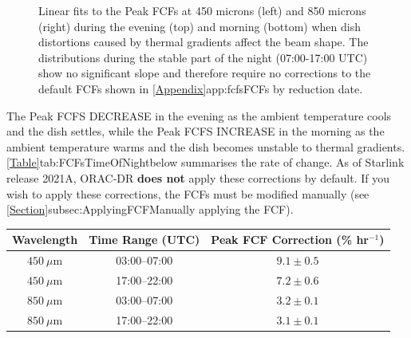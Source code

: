\begin{figure}
\begin{center}
\caption[FCFs Time of Night Fits]{Linear fits to the Peak FCFs at 450 microns (left) and 850 microns (right)
 during the evening (top) and morning (bottom) when dish distortions caused by thermal gradients affect the 
 beam shape. The distributions during the stable part of the night (07:00-17:00 UTC) show no significant 
 slope and therefore require no corrections to the default FCFs shown in
 \cref{Appendix}{app:fcfs}{FCFs by reduction date}. \label{fig:FCFsTimeOfNightFits}}
\end{center}
\end{figure}


The Peak FCFS DECREASE in the evening as the ambient temperature cools and the dish settles, while
the Peak FCFS INCREASE in the morning as the ambient temperature warms and the dish becomes
unstable to thermal gradients. \cref{Table}{tab:FCFsTimeOfNight}{below} summarises the rate of change.
As of Starlink release 2021A, ORAC-DR \textbf{does not} apply these corrections by default. If
you wish to apply these corrections, the FCFs must be modified manually (see
\cref{Section}{subsec:ApplyingFCF}{Manually applying the FCF}).


\begin{table}[h!]
\begin{center}
\begin{tabular}{|c|c|c|}
 \hline
 \multicolumn{1}{|c|}{Wavelength} &
 \multicolumn{1}{c|}{Time Range (UTC)} &
 \multicolumn{1}{c|}{Peak FCF Correction (\% hr$^{-1}$)}
 \\ \hline
$450~\mu$m & 03:00--07:00 & $9.1\pm0.5$ \\
$450~\mu$m & 17:00--22:00 & $7.2\pm0.6$ \\
\hline
$850~\mu$m & 03:00--07:00 & $3.2\pm0.1$ \\
$850~\mu$m & 17:00--22:00 & $3.1\pm0.1$ \\ \hline
\end{tabular}
\end{center}
\label{tab:FCFsTimeOfNight}
\end{table}

